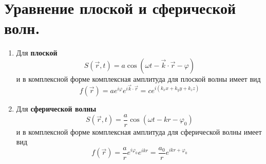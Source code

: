 \documentclass[a4paper, 12pt]{book}
\begin{document}
	\section{Уравнение плоской и сферической волн.}
	\begin{enumerate}
		\item Для \textbf{плоской}
		\begin{equation*}
			S\left(\vec{r},t\right)=a\cos\left(\omega t-\vec{k}\cdot\vec{r}-\varphi\right)
		\end{equation*}
		и в комплексной форме комплексная амплитуда для плоской волны имеет вид
		\begin{equation*}
			f\left(\vec{r}\right)=ae^{i\varphi}e^{i\vec{k}\cdot\vec{r}}=ce^{i\left(k_xx+k_yy+k_zz\right)}
		\end{equation*}
		\item Для \textbf{сферической волны}
		\begin{equation*}
			S\left(\vec{r},t\right)=\frac{a}{r}\cos\left(\omega t-kr-\varphi_0\right)
		\end{equation*}
		и в комплексной форме комплексная амплитуда для сферической волны имеет вид
		\begin{equation*}
			f\left(\vec{r}\right)=\frac{a}{r}e^{i\varphi_0}e^{ikr}=\frac{a_0}{r}e^{ikr+\varphi_0}
		\end{equation*}		
	\end{enumerate}
\end{document}
